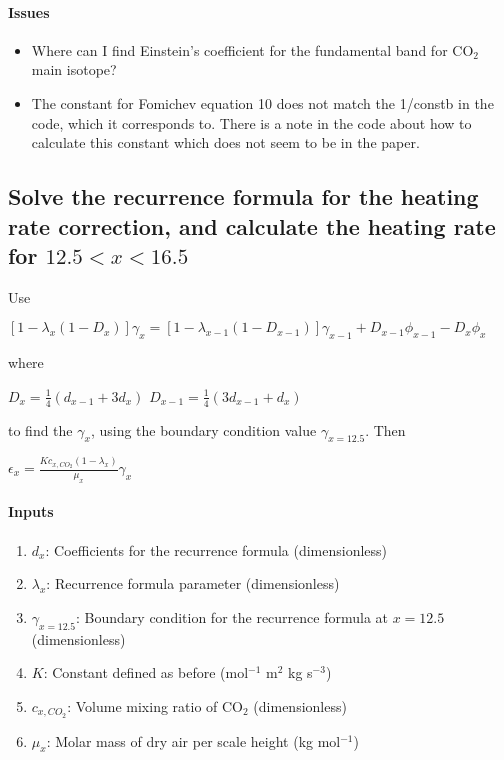    \paragraph{Issues}
   \begin{itemize}
   \item Where can I find Einstein's coefficient for the fundamental band for 
     CO$_2$ main isotope?
   \item The constant for Fomichev equation 10 does not match the 1/constb in 
     the code, which it corresponds to. There is a note in the code about how 
     to calculate this constant which does not seem to be in the paper.
   \end{itemize}

    
\subsection{Solve the recurrence formula for the heating rate 
  correction, and calculate the heating rate for $12.5 < x < 16.5$}

   Use

   \noindent $[1 - \lambda_x(1 - D_x)]\gamma_x = [1 - \lambda_{x-1}(1 - D_{x-1})]\gamma_{x-1} + D_{x-1}\phi_{x-1} - D_x\phi_x$

   \noindent where

   \noindent $D_x = \frac{1}{4}(d_{x-1} + 3d_x)$
   \noindent $D_{x-1} = \frac{1}{4}(3d_{x-1} + d_x)$

   \noindent to find the $\gamma_x$, using the boundary condition value $\gamma_{x=12.5}$. Then

   \noindent $\epsilon_x = \frac{K c_{x,CO_2}(1 - \lambda_x)}{\mu_x} \gamma_x$

   \paragraph{Inputs}
   \begin{enumerate}
   \item $d_x$: Coefficients for the recurrence formula (dimensionless)
   \item $\lambda_x$: Recurrence formula parameter (dimensionless)
   \item $\gamma_{x=12.5}$: Boundary condition for the recurrence formula 
     at $x = 12.5$ (dimensionless)
   \item $K$: Constant defined as before (mol$^{-1}$ m$^2$ kg s$^{-3}$)
   \item $c_{x,CO_2}$: Volume mixing ratio of CO$_2$ (dimensionless)
   \item $\mu_x$: Molar mass of dry air per scale height (kg mol$^{-1}$)
   \end{enumerate}

